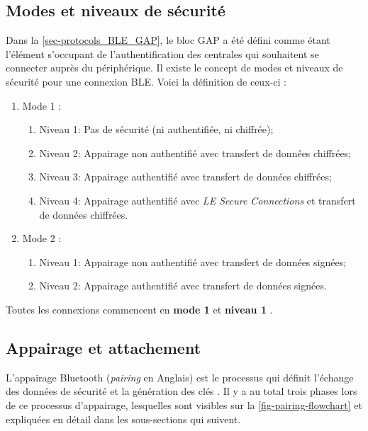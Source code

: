 \subsection{Modes et niveaux de sécurité}
Dans la \cref{sec-protocols_BLE_GAP}, le bloc GAP a été défini comme étant l'élément s'occupant de l'authentification des centrales qui souhaitent se connecter auprès du périphérique. 
Il existe le concept de modes et niveaux de sécurité pour une connexion BLE. Voici la définition de ceux-ci :
\begin{enumerate}
    \item Mode 1 :
    \begin{enumerate}
        \item Niveau 1: Pas de sécurité (ni authentifiée, ni chiffrée);
        \item Niveau 2: Appairage non authentifié avec transfert de données chiffrées;
        \item Niveau 3: Appairage authentifié avec transfert de données chiffrées;
        \item Niveau 4: Appairage authentifié avec \textit{LE Secure Connections} et transfert de données chiffrées.
    \end{enumerate}
    \item Mode 2 :
    \begin{enumerate}
        \item Niveau 1: Appairage non authentifié avec transfert de données signées;
        \item Niveau 2: Appairage authentifié avec transfert de données signées.
    \end{enumerate}
\end{enumerate}


Toutes les connexions commencent en \textbf{mode 1} et \textbf{niveau 1} \cite{microchip_ble_security:online}. 

\subsection{Appairage et attachement}

L'appairage Bluetooth (\textit{pairing} en Anglais) est le processus qui définit l'échange des données de sécurité et la génération des clés \cite{BLEpairi85:online}\cite{Bluetoot72:online}.  Il y a au total trois phases lors de ce processus d'appairage, lesquelles sont visibles sur la \cref{fig-pairing-flowchart} et expliquées en détail dans les sous-sections qui suivent. 

